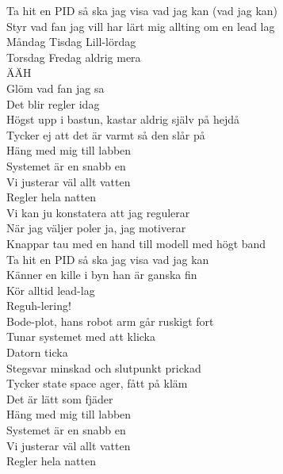 \documentclass[a6paper, 10pt, twoside]{article}
\begin{document}
\begin{center}
\end{center}
\begin{lyrics}
Ta hit en PID så ska jag visa vad jag kan (vad jag kan)\\
Styr vad fan jag vill har lärt mig allting om en lead lag\\
Måndag Tisdag Lill-lördag\\
Torsdag Fredag aldrig mera\\
ÄÄH\\
Glöm vad fan jag sa\\
Det blir regler idag\\
Högst upp i bastun, kastar aldrig själv på hejdå\\
Tycker ej att det är varmt så den slår på
\vspace{5pt}\\
Häng med mig till labben\\
Systemet är en snabb en\\
Vi justerar väl allt vatten\\
Regler hela natten
\vspace{5pt}\\
Vi kan ju konstatera att jag regulerar\\
När jag väljer poler ja, jag motiverar\\
Knappar tau med en hand till modell med högt band\\
Ta hit en PID så ska jag visa vad jag kan
\vspace{5pt}\\
Känner en kille i byn han är ganska fin\\
Kör alltid lead-lag\\
Reguh-lering!\\
Bode-plot, hans robot arm går ruskigt fort\\
Tunar systemet med att klicka\\
Datorn ticka\\
Stegsvar minskad och slutpunkt prickad\\
Tycker state space ager, fått på kläm\\
Det är lätt som fjäder
\vspace{5pt}\\
Häng med mig till labben\\
Systemet är en snabb en\\
Vi justerar väl allt vatten\\
Regler hela natten
\vspace{5pt}\\

\end{lyrics}
\end{document}
